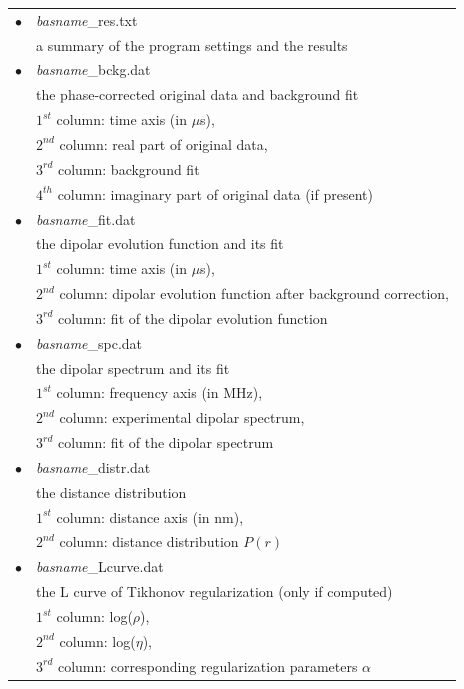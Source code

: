 \documentclass{article}
\begin{document}
\begin{tabular}{ll}
\noalign{\smallskip}
$\bullet$ & {\ttfamily \emph{basname}\_res.txt} \\
& a summary of the program settings and the results \\
$\bullet$ & {\ttfamily \emph{basname}\_bckg.dat} \\
& the phase-corrected original data and background fit \\
& $1^{st}$ column: time axis (in $\mu$s), \\
& $2^{nd}$ column: real part of original data, \\
& $3^{rd}$ column: background fit \\
& $4^{th}$ column: imaginary part of original data (if present) \\
$\bullet$ & {\ttfamily \emph{basname}\_fit.dat} \\
& the dipolar evolution function and its fit \\
& $1^{st}$ column: time axis (in $\mu$s), \\
& $2^{nd}$ column: dipolar evolution function after background correction, \\
& $3^{rd}$ column: fit of the dipolar evolution function \\
$\bullet$ & {\ttfamily \emph{basname}\_spc.dat} \\
& the dipolar spectrum and its fit \\
& $1^{st}$ column: frequency axis (in MHz), \\
& $2^{nd}$ column: experimental dipolar spectrum, \\
& $3^{rd}$ column: fit of the dipolar spectrum \\
$\bullet$ & {\ttfamily \emph{basname}\_distr.dat} \\
& the distance distribution \\
& $1^{st}$ column: distance axis (in nm), \\
& $2^{nd}$ column: distance distribution $P(r)$ \\
$\bullet$ & {\ttfamily \emph{basname}\_Lcurve.dat} \\
& the L curve of Tikhonov regularization (only if computed) \\
& $1^{st}$ column: log($\rho$), \\
& $2^{nd}$ column: log($\eta$), \\
& $3^{rd}$ column: corresponding regularization parameters $\alpha$ \\
\end{tabular}
\end{document}
